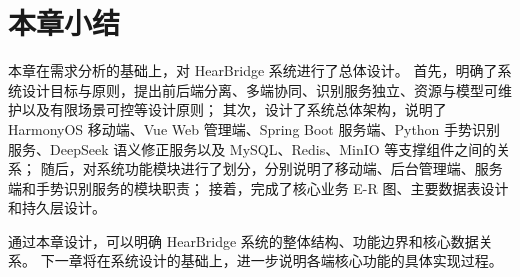 
\section{本章小结}

本章在需求分析的基础上，对 HearBridge 系统进行了总体设计。
首先，明确了系统设计目标与原则，提出前后端分离、多端协同、识别服务独立、资源与模型可维护以及有限场景可控等设计原则；
其次，设计了系统总体架构，说明了 HarmonyOS 移动端、Vue Web 管理端、Spring Boot 服务端、Python 手势识别服务、DeepSeek 语义修正服务以及 MySQL、Redis、MinIO 等支撑组件之间的关系；
随后，对系统功能模块进行了划分，分别说明了移动端、后台管理端、服务端和手势识别服务的模块职责；
接着，完成了核心业务 E-R 图、主要数据表设计和持久层设计。

通过本章设计，可以明确 HearBridge 系统的整体结构、功能边界和核心数据关系。
下一章将在系统设计的基础上，进一步说明各端核心功能的具体实现过程。
